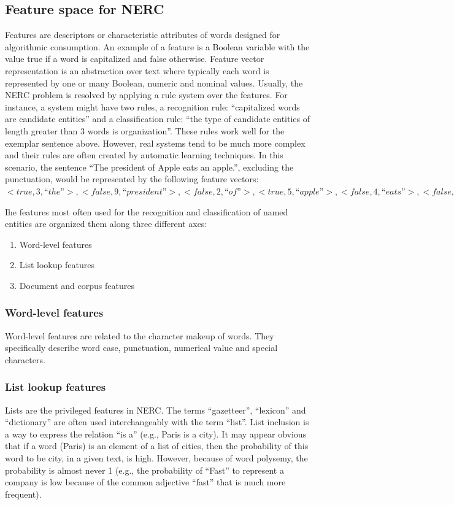 \documentclass[12pt,a4paper,final]{extreport}
\begin{document}
\subsection{Feature space for NERC}
Features are descriptors or characteristic attributes of words designed for algorithmic
consumption. An example of a feature is a Boolean variable with the value true if a word is capitalized and false otherwise. Feature vector representation is an abstraction over text where typically each word is represented by one or many Boolean, numeric and nominal values.
Usually, the NERC problem is resolved by applying a rule system over the features. For instance, a system might have two rules, a recognition rule: “capitalized words are candidate entities” and a classification rule: “the type of candidate entities of length greater than 3 words is organization”. These rules work well for the exemplar sentence
above. However, real systems tend to be much more complex and their rules are often created by automatic learning techniques.
In this scenario, the sentence “The president of Apple eats an apple.”, excluding the punctuation, would be represented by the following feature vectors:
$<true, 3, “the”>, <false, 9, “president”>, <false, 2, “of”>, <true,
5, “apple”>, <false, 4, “eats”>, <false, 2, “an”>, <false, 5, “apple”>$

\vspace{0.5cm}
Ihe features most often used for the recognition and
classification of named entities are organized them along three different axes:
\begin{enumerate}
	\item Word-level features
	\item List lookup features
	\item Document and corpus features
\end{enumerate}
\subsubsection{Word-level features}
Word-level features are related to the character makeup of words. They specifically describe word case, punctuation, numerical value and special characters.


\subsubsection{List lookup features}
Lists are the privileged features in NERC. The terms “gazetteer”, “lexicon” and “dictionary” are often used interchangeably with the term “list”. List inclusion is a way to express the relation “is a” (e.g., Paris is a city). It may appear obvious that if a word (Paris) is an element of a list of cities, then the probability of this word to be city, in a given text, is high. However, because of word polysemy, the probability is almost never 1 (e.g., the probability of “Fast” to represent a company is low because of the common adjective “fast” that is much more frequent).
\end{document}
